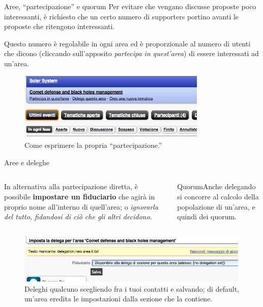 \begin{frame}{Aree, ``partecipazione'' e quorum}
Per evitare che vengano discusse proposte poco interessanti, è richiesto che un certo numero di supporters portino avanti le proposte che ritengono interessanti.

Questo numero è regolabile in ogni area ed è proporzionale al numero di utenti che dicono (cliccando sull'apposito \emph{partecipa in quest'area}) di essere interessati ad un'area.
\begin{figure}\includegraphics[width=0.8\textwidth]{pics/partecipa}
\caption{Come esprimere la propria ``partecipazione.''}
\end{figure}
\end{frame}

\begin{frame}[b]{Aree e deleghe}
\begin{columns}\begin{column}{.6\textwidth}
In alternativa alla partecipazione diretta, è possibile \textbf{impostare un fiduciario} che agirà in proprio nome all'interno di quell'area; o \textit{ignorarla del tutto, fidandosi di ciò che gli altri decidono}.\end{column}
\begin{column}{.4\textwidth}\begin{block}{Quorum}Anche delegando si concorre al calcolo della popolazione di un'area, e quindi dei quorum.\end{block}\end{column}
\end{columns}
\begin{figure}\centering\includegraphics[width=0.99\textwidth]{pics/delega}
\caption{Deleghi qualcuno scegliendo fra i tuoi contatti e salvando; di default, un'area eredita le impostazioni dalla sezione che la contiene.}
\end{figure}
\end{frame}

